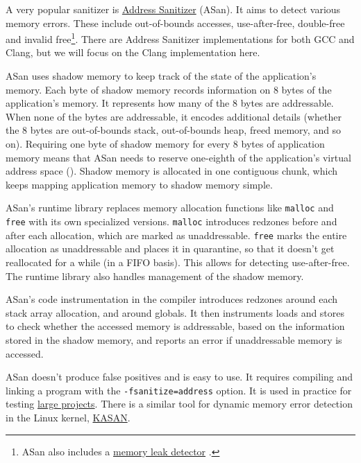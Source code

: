 \documentclass[
  a4paper,
]{report}
\begin{document}
A very popular sanitizer is
\href{https://clang.llvm.org/docs/AddressSanitizer.html}{Address
Sanitizer} (ASan). It aims to detect
various memory errors. These include out-of-bounds accesses,
use-after-free, double-free and invalid free\footnote{ASan also includes
  a \href{https://clang.llvm.org/docs/LeakSanitizer.html}{memory leak
  detector} .}. There are Address Sanitizer
implementations for both GCC  and Clang, but we
will focus on the Clang implementation here.

ASan uses shadow memory to keep track of the state
of the application's memory. Each byte of shadow memory records
information on 8 bytes of the application's memory. It represents how
many of the 8 bytes are addressable. When none of the bytes are
addressable, it encodes additional details (whether the 8 bytes are
out-of-bounds stack, out-of-bounds heap, freed memory, and so on).
Requiring one byte of shadow memory for every 8 bytes of application
memory means that ASan needs to reserve one-eighth of the application's
virtual address space (). Shadow memory is allocated in one contiguous chunk, which keeps
mapping application memory to shadow memory simple.

ASan's runtime library replaces memory allocation functions like
\texttt{malloc} and \texttt{free} with its own
specialized versions. \texttt{malloc} introduces redzones
before and after each allocation, which are marked as unaddressable.
\texttt{free} marks the entire allocation as unaddressable and places it
in quarantine, so that it doesn't get reallocated for a while (in a FIFO
basis). This allows for detecting use-after-free. The runtime library
also handles management of the shadow memory.

ASan's code instrumentation in the compiler introduces redzones around
each stack array allocation, and around globals. It then instruments
loads and stores to check whether the accessed memory is addressable,
based on the information stored in the shadow memory, and reports an
error if unaddressable memory is accessed.

ASan doesn't produce false positives and is easy to use. It requires
compiling and linking a program with the \texttt{-fsanitize=address}
option. It is used in practice for testing
\href{https://chromium.googlesource.com/chromium/src/+/HEAD/docs/asan.md}{large
projects}. There is a similar tool for dynamic memory error detection in
the Linux kernel,
\href{https://www.kernel.org/doc/html/v5.0/dev-tools/kasan.html}{KASAN}.
\end{document}
